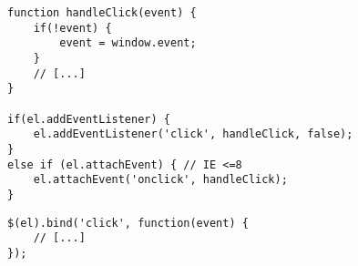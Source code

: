 \begin{lstlisting}[label=lst:js-events-plain,caption=Event-Handling ohne Abstraktion]
function handleClick(event) {
    if(!event) {
        event = window.event;
    }
    // [...]
}

if(el.addEventListener) {
    el.addEventListener('click', handleClick, false);
}
else if (el.attachEvent) { // IE <=8
    el.attachEvent('onclick', handleClick);
}
\end{lstlisting}

\begin{lstlisting}[label=lst:js-events-jquery,caption=Event-Handling mit jQuery]
$(el).bind('click', function(event) {
    // [...]
});
\end{lstlisting}

